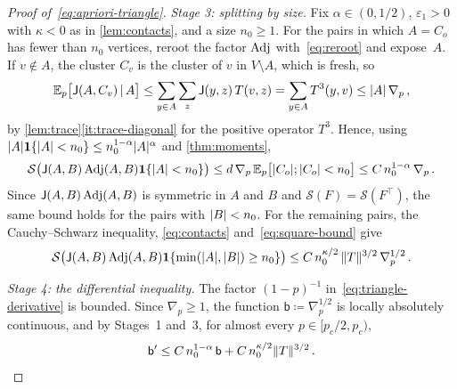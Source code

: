 \begin{proof}[Proof of~\eqref{eq:apriori-triangle}]
\emph{Stage 3: splitting by size.} Fix $\alpha\in(0,1/2)$, $\varepsilon_1>0$ with $\kappa<0$ as in
\cref{lem:contacts}, and a size $n_0\ge1$. For the pairs in which $A=C_o$ has fewer than $n_0$ vertices,
reroot the factor $\operatorname{Adj}$ with~\eqref{eq:reroot} and expose~$A$. If $v\notin A$, the cluster $C_v$ is
the cluster of $v$ in $V\setminus A$, which is fresh, so
\begin{equation*}
  \mathbb E_p\bigl[\mathsf J(A,C_v)\,\lvert\, A\bigr]\le\sum_{y\in A}\sum_z\mathsf J(y,z)\,T(v,z)=\sum_{y\in A}T^3(y,v)\le\lvert A\rvert\,\nabla_p\,,
\end{equation*}
by \cref{lem:trace}\ref{it:trace-diagonal} for the positive operator $T^3$. Hence, using
$\lvert A\rvert\mathbf{1}\{\lvert A\rvert<n_0\}\le n_0^{1-\alpha}\lvert A\rvert^\alpha$ and \cref{thm:moments},
\begin{equation*}
  \mathcal S\bigl(\mathsf J(A,B)\operatorname{Adj}(A,B)\mathbf{1}\{\lvert A\rvert<n_0\}\bigr)\le d\,\nabla_p\,\mathbb E_p\bigl[\lvert C_o\rvert;\lvert C_o\rvert<n_0\bigr]
  \le C\,n_0^{1-\alpha}\,\nabla_p\,.
\end{equation*}
Since $\mathsf J(A,B)\operatorname{Adj}(A,B)$ is symmetric in $A$ and $B$ and $\mathcal S(F)=\mathcal S(F^\top)$, the same
bound holds for the pairs with $\lvert B\rvert<n_0$. For the remaining pairs, the Cauchy--Schwarz inequality,
\eqref{eq:contacts} and~\eqref{eq:square-bound} give
\begin{equation*}
  \mathcal S\bigl(\mathsf J(A,B)\operatorname{Adj}(A,B)\mathbf{1}\{\min(\lvert A\rvert,\lvert B\rvert)\ge n_0\}\bigr)
  \le C\,n_0^{\kappa/2}\,\lVert T\rVert^{3/2}\,\nabla_p^{1/2}\,.
\end{equation*}

\emph{Stage 4: the differential inequality.} The factor $(1-p)^{-1}$ in~\eqref{eq:triangle-derivative}
is bounded. Since $\nabla_p\ge1$, the function $\mathsf b\coloneqq\nabla_p^{1/2}$ is locally absolutely
continuous, and by Stages~1 and~3, for almost every $p\in[p_c/2,p_c)$,
\begin{equation}\label{eq:triangle-ode}
  \mathsf b'\le C\,n_0^{1-\alpha}\,\mathsf b+C\,n_0^{\kappa/2}\lVert T\rVert^{3/2}\,.
\end{equation}


\end{proof}
